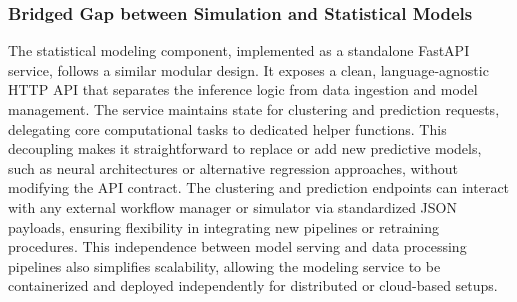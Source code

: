 
\subsubsection{Bridged Gap between Simulation and Statistical Models}
\label{sec:statistical_modeling}
The statistical modeling component, implemented as a standalone FastAPI service, follows a similar modular design. It exposes a clean, language-agnostic HTTP API that separates the inference logic from data ingestion and model management. The service maintains state for clustering and prediction requests, delegating core computational tasks to dedicated helper functions. This decoupling makes it straightforward to replace or add new predictive models, such as neural architectures or alternative regression approaches, without modifying the API contract. The clustering and prediction endpoints can interact with any external workflow manager or simulator via standardized JSON payloads, ensuring flexibility in integrating new pipelines or retraining procedures. This independence between model serving and data processing pipelines also simplifies scalability, allowing the modeling service to be containerized and deployed independently for distributed or cloud-based setups.

